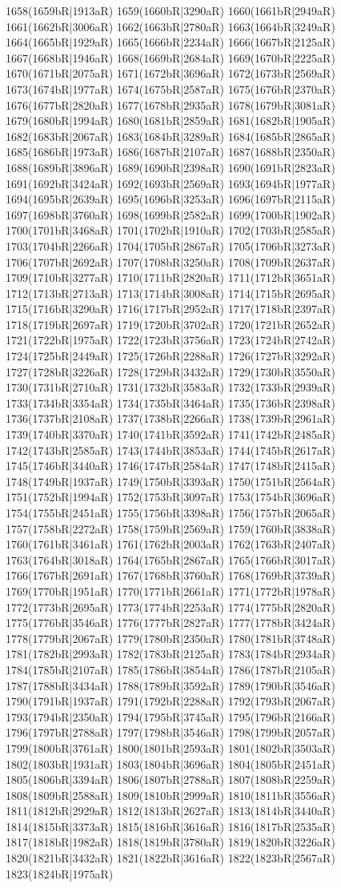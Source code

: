 1658(1659bR|1913aR) 1659(1660bR|3290aR) 1660(1661bR|2949aR) 1661(1662bR|3006aR) 1662(1663bR|2780aR) 1663(1664bR|3249aR) 1664(1665bR|1929aR) 1665(1666bR|2234aR) 1666(1667bR|2125aR) 1667(1668bR|1946aR) 1668(1669bR|2684aR) 1669(1670bR|2225aR) 1670(1671bR|2075aR) 1671(1672bR|3696aR) 1672(1673bR|2569aR) 1673(1674bR|1977aR) 1674(1675bR|2587aR) 1675(1676bR|2370aR) 1676(1677bR|2820aR) 1677(1678bR|2935aR) 1678(1679bR|3081aR) 1679(1680bR|1994aR) 1680(1681bR|2859aR) 1681(1682bR|1905aR) 1682(1683bR|2067aR) 1683(1684bR|3289aR) 1684(1685bR|2865aR) 1685(1686bR|1973aR) 1686(1687bR|2107aR) 1687(1688bR|2350aR) 1688(1689bR|3896aR) 1689(1690bR|2398aR) 1690(1691bR|2823aR) 1691(1692bR|3424aR) 1692(1693bR|2569aR) 1693(1694bR|1977aR) 1694(1695bR|2639aR) 1695(1696bR|3253aR) 1696(1697bR|2115aR) 1697(1698bR|3760aR) 1698(1699bR|2582aR) 1699(1700bR|1902aR) 1700(1701bR|3468aR) 1701(1702bR|1910aR) 1702(1703bR|2585aR) 1703(1704bR|2266aR) 1704(1705bR|2867aR) 1705(1706bR|3273aR) 1706(1707bR|2692aR) 1707(1708bR|3250aR) 1708(1709bR|2637aR) 1709(1710bR|3277aR) 1710(1711bR|2820aR) 1711(1712bR|3651aR) 1712(1713bR|2713aR) 1713(1714bR|3008aR) 1714(1715bR|2695aR) 1715(1716bR|3290aR) 1716(1717bR|2952aR) 1717(1718bR|2397aR) 1718(1719bR|2697aR) 1719(1720bR|3702aR) 1720(1721bR|2652aR) 1721(1722bR|1975aR) 1722(1723bR|3756aR) 1723(1724bR|2742aR) 1724(1725bR|2449aR) 1725(1726bR|2288aR) 1726(1727bR|3292aR) 1727(1728bR|3226aR) 1728(1729bR|3432aR) 1729(1730bR|3550aR) 1730(1731bR|2710aR) 1731(1732bR|3583aR) 1732(1733bR|2939aR) 1733(1734bR|3354aR) 1734(1735bR|3464aR) 1735(1736bR|2398aR) 1736(1737bR|2108aR) 1737(1738bR|2266aR) 1738(1739bR|2961aR) 1739(1740bR|3370aR) 1740(1741bR|3592aR) 1741(1742bR|2485aR) 1742(1743bR|2585aR) 1743(1744bR|3853aR) 1744(1745bR|2617aR) 1745(1746bR|3440aR) 1746(1747bR|2584aR) 1747(1748bR|2415aR) 1748(1749bR|1937aR) 1749(1750bR|3393aR) 1750(1751bR|2564aR) 1751(1752bR|1994aR) 1752(1753bR|3097aR) 1753(1754bR|3696aR) 1754(1755bR|2451aR) 1755(1756bR|3398aR) 1756(1757bR|2065aR) 1757(1758bR|2272aR) 1758(1759bR|2569aR) 1759(1760bR|3838aR) 1760(1761bR|3461aR) 1761(1762bR|2003aR) 1762(1763bR|2407aR) 1763(1764bR|3018aR) 1764(1765bR|2867aR) 1765(1766bR|3017aR) 1766(1767bR|2691aR) 1767(1768bR|3760aR) 1768(1769bR|3739aR) 1769(1770bR|1951aR) 1770(1771bR|2661aR) 1771(1772bR|1978aR) 1772(1773bR|2695aR) 1773(1774bR|2253aR) 1774(1775bR|2820aR) 1775(1776bR|3546aR) 1776(1777bR|2827aR) 1777(1778bR|3424aR) 1778(1779bR|2067aR) 1779(1780bR|2350aR) 1780(1781bR|3748aR) 1781(1782bR|2993aR) 1782(1783bR|2125aR) 1783(1784bR|2934aR) 1784(1785bR|2107aR) 1785(1786bR|3854aR) 1786(1787bR|2105aR) 1787(1788bR|3434aR) 1788(1789bR|3592aR) 1789(1790bR|3546aR) 1790(1791bR|1937aR) 1791(1792bR|2288aR) 1792(1793bR|2067aR) 1793(1794bR|2350aR) 1794(1795bR|3745aR) 1795(1796bR|2166aR) 1796(1797bR|2788aR) 1797(1798bR|3546aR) 1798(1799bR|2057aR) 1799(1800bR|3761aR) 1800(1801bR|2593aR) 1801(1802bR|3503aR) 1802(1803bR|1931aR) 1803(1804bR|3696aR) 1804(1805bR|2451aR) 1805(1806bR|3394aR) 1806(1807bR|2788aR) 1807(1808bR|2259aR) 1808(1809bR|2588aR) 1809(1810bR|2999aR) 1810(1811bR|3556aR) 1811(1812bR|2929aR) 1812(1813bR|2627aR) 1813(1814bR|3440aR) 1814(1815bR|3373aR) 1815(1816bR|3616aR) 1816(1817bR|2535aR) 1817(1818bR|1982aR) 1818(1819bR|3780aR) 1819(1820bR|3226aR) 1820(1821bR|3432aR) 1821(1822bR|3616aR) 1822(1823bR|2567aR) 1823(1824bR|1975aR) 